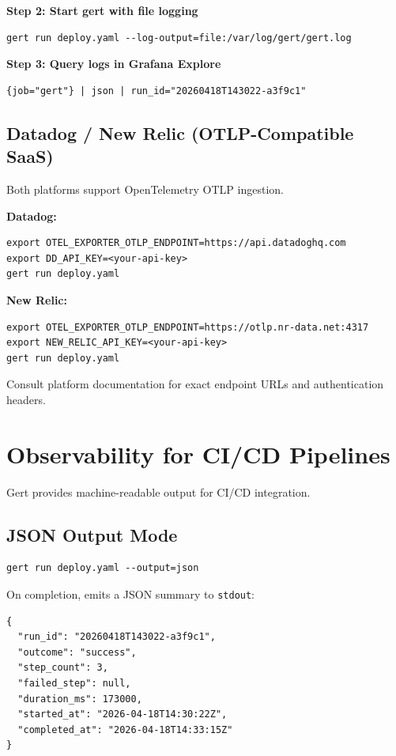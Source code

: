 \textbf{Step 2: Start gert with file logging}
\begin{verbatim}
gert run deploy.yaml --log-output=file:/var/log/gert/gert.log
\end{verbatim}

\textbf{Step 3: Query logs in Grafana Explore}
\begin{verbatim}
{job="gert"} | json | run_id="20260418T143022-a3f9c1"
\end{verbatim}

\subsection{Datadog / New Relic (OTLP-Compatible SaaS)}

Both platforms support OpenTelemetry OTLP ingestion.

\textbf{Datadog:}
\begin{verbatim}
export OTEL_EXPORTER_OTLP_ENDPOINT=https://api.datadoghq.com
export DD_API_KEY=<your-api-key>
gert run deploy.yaml
\end{verbatim}

\textbf{New Relic:}
\begin{verbatim}
export OTEL_EXPORTER_OTLP_ENDPOINT=https://otlp.nr-data.net:4317
export NEW_RELIC_API_KEY=<your-api-key>
gert run deploy.yaml
\end{verbatim}

Consult platform documentation for exact endpoint URLs and authentication headers.

\section{Observability for CI/CD Pipelines}

Gert provides machine-readable output for CI/CD integration.

\subsection{JSON Output Mode}

\begin{verbatim}
gert run deploy.yaml --output=json
\end{verbatim}

On completion, emits a JSON summary to \texttt{stdout}:

\begin{verbatim}
{
  "run_id": "20260418T143022-a3f9c1",
  "outcome": "success",
  "step_count": 3,
  "failed_step": null,
  "duration_ms": 173000,
  "started_at": "2026-04-18T14:30:22Z",
  "completed_at": "2026-04-18T14:33:15Z"
}
\end{verbatim}

